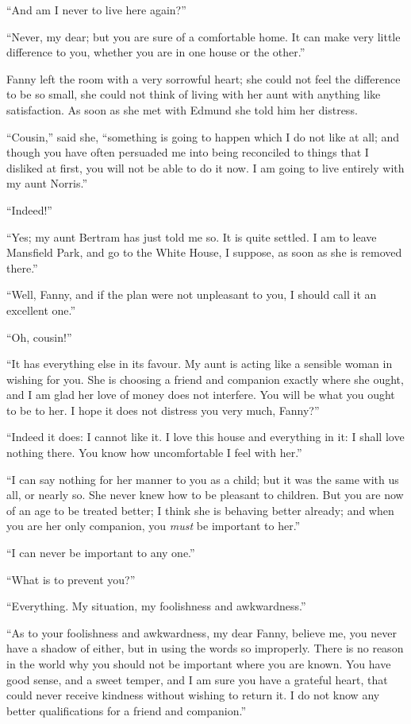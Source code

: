 ``And am I never to live here again?''

``Never, my dear; but you are sure of a comfortable home.
It can make very little difference to you, whether you are
in one house or the other.''

Fanny left the room with a very sorrowful heart; she could
not feel the difference to be so small, she could not think
of living with her aunt with anything like satisfaction.
As soon as she met with Edmund she told him her distress.

``Cousin,'' said she, ``something is going to happen which I
do not like at all; and though you have often persuaded me
into being reconciled to things that I disliked at first,
you will not be able to do it now.  I am going to live
entirely with my aunt Norris.''

``Indeed!''

``Yes; my aunt Bertram has just told me so.  It is quite settled.
I am to leave Mansfield Park, and go to the White House,
I suppose, as soon as she is removed there.''

``Well, Fanny, and if the plan were not unpleasant to you,
I should call it an excellent one.''

``Oh, cousin!''

``It has everything else in its favour.  My aunt is
acting like a sensible woman in wishing for you.  She is
choosing a friend and companion exactly where she ought,
and I am glad her love of money does not interfere.
You will be what you ought to be to her.  I hope it does
not distress you very much, Fanny?''

``Indeed it does:  I cannot like it.  I love this house
and everything in it:  I shall love nothing there.
You know how uncomfortable I feel with her.''

``I can say nothing for her manner to you as a child;
but it was the same with us all, or nearly so.  She never
knew how to be pleasant to children.  But you are now
of an age to be treated better; I think she is behaving
better already; and when you are her only companion,
you \emph{must} be important to her.''

``I can never be important to any one.''

``What is to prevent you?''

``Everything.  My situation, my foolishness and awkwardness.''

``As to your foolishness and awkwardness, my dear Fanny,
believe me, you never have a shadow of either, but in using
the words so improperly.  There is no reason in the world
why you should not be important where you are known.
You have good sense, and a sweet temper, and I am sure you
have a grateful heart, that could never receive kindness
without wishing to return it.  I do not know any better
qualifications for a friend and companion.''

